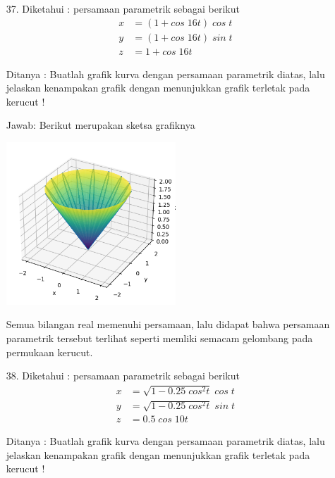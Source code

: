 \documentclass[twoside]{scrarticle}
\begin{document}
\begin{enumerate}
		\item[37.] Diketahui : persamaan parametrik sebagai berikut
		\begin{equation*}
			\begin{aligned}
				x & = (1+cos\;16t)\;cos\;t\\
				y & = (1+cos\;16t)\;sin\;t\\
				z & = 1 + cos\;16t
			\end{aligned}
		\end{equation*}
		
		Ditanya : Buatlah grafik kurva dengan persamaan parametrik diatas, lalu jelaskan kenampakan grafik dengan menunjukkan grafik terletak pada kerucut !
		
		Jawab: Berikut merupakan sketsa grafiknya
		
		\begin{minipage}{\linewidth}
			\includegraphics[width=0.5\textwidth]{37.png}
			\centering
		\end{minipage}
		
		Semua bilangan real memenuhi persamaan, lalu didapat bahwa persamaan parametrik tersebut terlihat seperti memliki semacam gelombang pada permukaan kerucut.
		
		\item[38.] Diketahui : persamaan parametrik sebagai berikut
		\begin{equation*}
			\begin{aligned}
				x & = \sqrt{1-0.25\;cos^2t}\;cos\;t\\
				y & = \sqrt{1-0.25\;cos^2t}\;sin\;t\\
				z & = 0.5\;cos\;10t
			\end{aligned}
		\end{equation*}
		
		Ditanya : Buatlah grafik kurva dengan persamaan parametrik diatas, lalu jelaskan kenampakan grafik dengan menunjukkan grafik terletak pada kerucut !
		

\end{enumerate}
\end{document}
